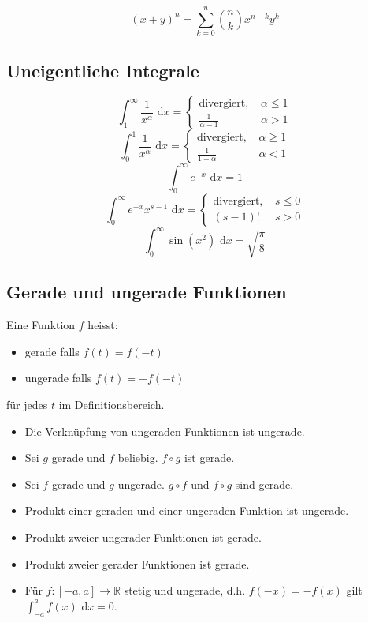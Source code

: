 \documentclass[a4paper,10pt]{article}
\def\dx{\text{ d}x}
\begin{document}
$$(x+y)^n = \sum_{k=0}^n {n \choose k} x^{n-k} y^k$$

\subsection{Uneigentliche Integrale}
$$\int_1^\infty \frac{1}{x^\alpha} \dx = \begin{cases}
  \text{divergiert, } & \alpha \leq 1\\
  \frac{1}{\alpha - 1} & \alpha > 1
\end{cases}$$
$$\int_0^1 \frac{1}{x^\alpha} \dx = \begin{cases}
  \text{divergiert, } & \alpha \geq 1\\
  \frac{1}{1- \alpha} & \alpha < 1
\end{cases}$$
$$\int_0^\infty e^{-x} \dx = 1$$
$$\int_0^\infty e^{-x}x^{s-1} \dx = \begin{cases}
  \text{divergiert, } & s \leq 0\\
  (s-1)! & s > 0
\end{cases}$$
$$\int_0^\infty \sin(x^2) \dx = \sqrt{\frac{\pi}{8}}$$

\subsection{Gerade und ungerade Funktionen}

Eine Funktion $f$ heisst:

\begin{itemize}
  \item gerade falls $f(t) = f(-t)$
  \item ungerade falls $f(t) = -f(-t)$
\end{itemize}

für jedes $t$ im Definitionsbereich.

\begin{itemize}
  \item Die Verknüpfung von ungeraden Funktionen ist ungerade. 
  \item Sei $g$ gerade und $f$ beliebig. $f \circ g$ ist gerade.
  \item Sei $f$ gerade und $g$ ungerade. $g \circ f$ und $f \circ g$ sind gerade.
  \item Produkt einer geraden und einer ungeraden Funktion ist ungerade.
  \item Produkt zweier ungerader Funktionen ist gerade.
  \item Produkt zweier gerader Funktionen ist gerade.
  \item Für $f: [-a, a] \to \mathbb{R}$ stetig und ungerade, d.h. $f(-x) = -f(x)$ gilt $\int_{-a}^a f(x) \dx = 0$.
\end{itemize}
\end{document}
